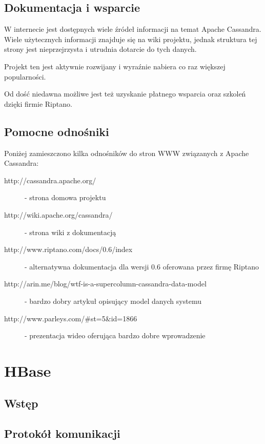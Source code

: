 \subsection*{Dokumentacja i wsparcie}

W internecie jest dostępnych wiele źródeł informacji na temat Apache Cassandra.
Wiele użytecznych informacji znajduje się na wiki projektu, jednak struktura tej strony jest nieprzejrzysta i utrudnia dotarcie do tych danych.

Projekt ten jest aktywnie rozwijany i wyraźnie nabiera co raz większej popularności.

Od dość niedawna możliwe jest też uzyskanie płatnego wsparcia oraz szkoleń dzięki firmie Riptano.

\subsection*{Pomocne odnośniki}

Poniżej zamieszczono kilka odnośników do stron WWW związanych z Apache Cassandra:

\begin{description}
 \item [http://cassandra.apache.org/] - strona domowa projektu
 \item [http://wiki.apache.org/cassandra/] - strona wiki z dokumentacją
 \item [http://www.riptano.com/docs/0.6/index] - alternatywna dokumentacja dla wersji 0.6 oferowana przez firmę Riptano
 \item [http://arin.me/blog/wtf-is-a-supercolumn-cassandra-data-model] - bardzo dobry artykuł opisujący model danych systemu
 \item [http://www.parleys.com/\#st=5\&id=1866] - prezentacja wideo oferująca bardzo dobre wprowadzenie
\end{description}

\section{HBase}
\label{sec:hbase}

\subsection*{Wstęp} 

\subsection*{Protokół komunikacji}

